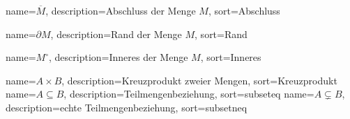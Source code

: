 
{
  name={\ensuremath{\overline{M}}},
  description={Abschluss der Menge $M$},
  sort=Abschluss
}

{
  name={\ensuremath{\partial M}},
  description={Rand der Menge $M$},
  sort=Rand
}

{
  name={\ensuremath{M^\circ}},
  description={Inneres der Menge $M$},
  sort=Inneres
}

{
  name={\ensuremath{A \times B}},
  description={Kreuzprodukt zweier Mengen},
  sort=Kreuzprodukt
}
{
  name={\ensuremath{A \subseteq B}},
  description={Teilmengenbeziehung},
  sort=subseteq
}
{
  name={\ensuremath{A \subsetneq B}},
  description={echte Teilmengenbeziehung},
  sort=subsetneq
}

\renewcommand*{\glossaryname}{\glossarName}

\glsaddall
\printglossaries

